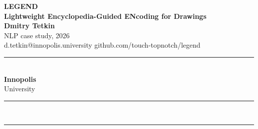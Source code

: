 \documentclass[a0,portrait]{a0poster}
\begin{document}
\begin{minipage}[b]{0.74\linewidth}
{\VeryHuge \color{NavyBlue} \textbf{LEGEND}}\\[0.7cm]
{\Huge \bfseries Lightweight Encyclopedia-Guided ENcoding for Drawings}\\[1.4cm]
{\huge \bfseries Dmitry Tetkin}\\[0.45cm]
{\huge NLP case study, 2026}\\[0.45cm]
{\Large d.tetkin@innopolis.university \quad\textbullet\quad
        github.com/touch-topnotch/legend}\\
\end{minipage}
\hfill
\begin{minipage}[b]{0.24\linewidth}
\flushright
{\color{NavyBlue}\rule{\linewidth}{6pt}}\\[0.6cm]
{\fontsize{72}{86}\selectfont\bfseries Innopolis}\\[0.3cm]
{\fontsize{56}{66}\selectfont University}\\[0.6cm]
{\color{NavyBlue}\rule{\linewidth}{3pt}}\\
\end{minipage}

\vspace{1.4cm}
{\color{NavyBlue}\rule{\linewidth}{2pt}}
\vspace{0.6cm}
\end{document}
